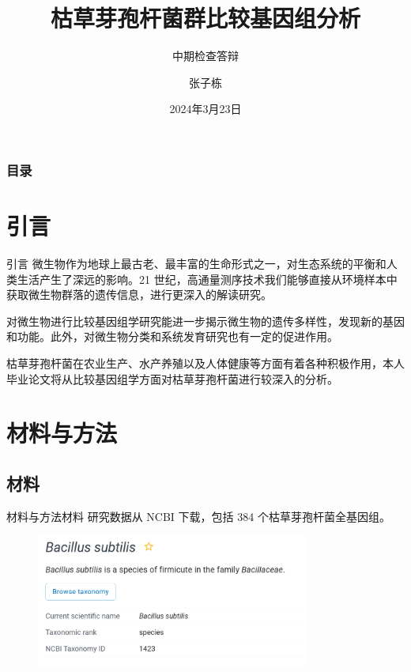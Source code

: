\documentclass{beamer}
\author[张子栋]{张子栋}
\title[枯草芽孢杆菌群比较基因组分析]{枯草芽孢杆菌群比较基因组分析}
\subtitle{中期检查答辩}
\institute[HZAU CoI]{华中农业大学
	
	信息学院}
\date[2024.3.23]{2024年3月23日}
\begin{document}
	\kaishu
	
	\frame{\titlepage}
	
	\begin{frame}
		\frametitle{目录}
		\tableofcontents
	\end{frame}
	
	\section{引言}

	\begin{frame}{引言}
		\qquad 微生物作为地球上最古老、最丰富的生命形式之一，对生态系统的平衡和人类生活产生了深远的影响。21 世纪，高通量测序技术我们能够直接从环境样本中获取微生物群落的遗传信息，进行更深入的解读研究。

		\qquad 对微生物进行比较基因组学研究能进一步揭示微生物的遗传多样性，发现新的基因和功能。此外，对微生物分类和系统发育研究也有一定的促进作用。

		\qquad 枯草芽孢杆菌在农业生产、水产养殖以及人体健康等方面有着各种积极作用，本人毕业论文将从比较基因组学方面对枯草芽孢杆菌进行较深入的分析。
	\end{frame}

	\section{材料与方法}
	\subsection{材料}
	\begin{frame}{材料与方法}{材料}
		\qquad 研究数据从 NCBI 下载，包括 384 个枯草芽孢杆菌全基因组。

		\begin{figure}
			\centering
			\includegraphics[width=0.8\textwidth]{figure/NCBI.png}
		\end{figure}
	\end{frame}
\end{document}
